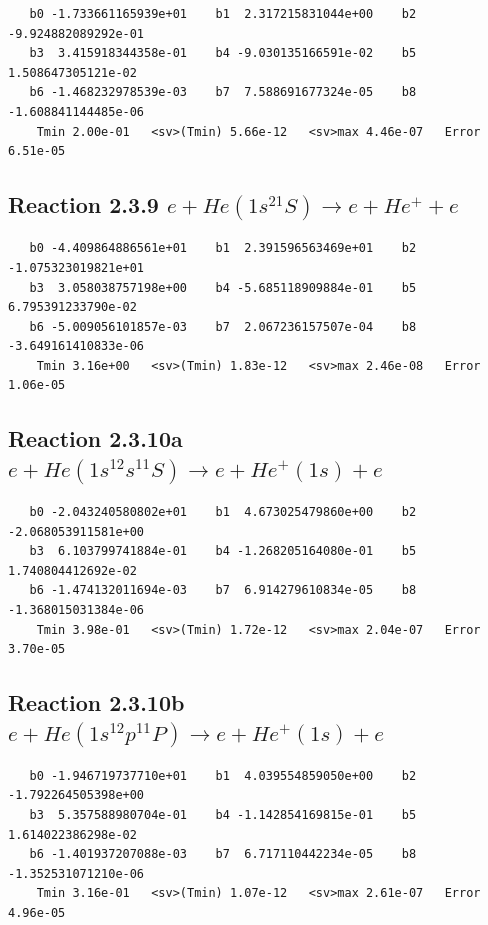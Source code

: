 \documentclass[12pt,dvipdfmx]{article}
\begin{document}
\begin{small}\begin{verbatim}
   b0 -1.733661165939e+01    b1  2.317215831044e+00    b2 -9.924882089292e-01
   b3  3.415918344358e-01    b4 -9.030135166591e-02    b5  1.508647305121e-02
   b6 -1.468232978539e-03    b7  7.588691677324e-05    b8 -1.608841144485e-06
    Tmin 2.00e-01   <sv>(Tmin) 5.66e-12   <sv>max 4.46e-07   Error 6.51e-05
\end{verbatim}\end{small}

\newpage
\subsection{
Reaction 2.3.9 $   e + He(1s^21S) \rightarrow e + He^+ + e$}


\begin{small}\begin{verbatim}
   b0 -4.409864886561e+01    b1  2.391596563469e+01    b2 -1.075323019821e+01
   b3  3.058038757198e+00    b4 -5.685118909884e-01    b5  6.795391233790e-02
   b6 -5.009056101857e-03    b7  2.067236157507e-04    b8 -3.649161410833e-06
    Tmin 3.16e+00   <sv>(Tmin) 1.83e-12   <sv>max 2.46e-08   Error 1.06e-05
\end{verbatim}\end{small}

\newpage
\subsection{
Reaction 2.3.10a $ e + He(1s^12s^11S) \rightarrow e + He^+(1s) + e$}


\begin{small}\begin{verbatim}
   b0 -2.043240580802e+01    b1  4.673025479860e+00    b2 -2.068053911581e+00
   b3  6.103799741884e-01    b4 -1.268205164080e-01    b5  1.740804412692e-02
   b6 -1.474132011694e-03    b7  6.914279610834e-05    b8 -1.368015031384e-06
    Tmin 3.98e-01   <sv>(Tmin) 1.72e-12   <sv>max 2.04e-07   Error 3.70e-05
\end{verbatim}\end{small}

\newpage
\subsection{
Reaction 2.3.10b $  e + He(1s^12p^11P) \rightarrow e + He^+(1s) + e$}


\begin{small}\begin{verbatim}
   b0 -1.946719737710e+01    b1  4.039554859050e+00    b2 -1.792264505398e+00
   b3  5.357588980704e-01    b4 -1.142854169815e-01    b5  1.614022386298e-02
   b6 -1.401937207088e-03    b7  6.717110442234e-05    b8 -1.352531071210e-06
    Tmin 3.16e-01   <sv>(Tmin) 1.07e-12   <sv>max 2.61e-07   Error 4.96e-05
\end{verbatim}\end{small}
\end{document}
